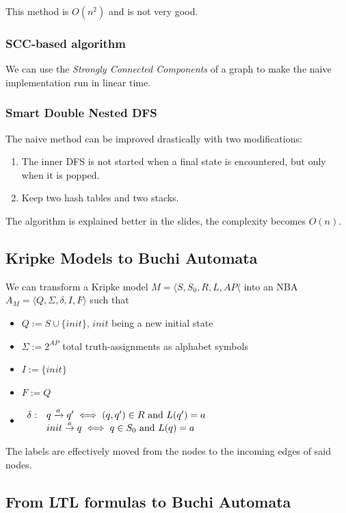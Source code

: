 \documentclass{article}
\begin{document}
This method is $O(n^2)$ and is not very good.

\subsubsection{SCC-based algorithm}
We can use the \textit{Strongly Connected Components} of a graph to make the naive implementation run in linear time.

\subsubsection{Smart Double Nested DFS}
The naive method can be improved drastically with two modifications:
\begin{enumerate}
    \item The inner DFS is not started when a final state is encountered, but only when it is popped.
    \item Keep two hash tables and two stacks.
\end{enumerate}

The algorithm is explained better in the slides, the complexity becomes $O(n)$.

\subsection{Kripke Models to Buchi Automata}
We can transform a Kripke model $M=\langle S, S_0, R, L, AP\langle$ into an NBA $A_M=\langle Q,\Sigma,\delta,I,F\rangle$ such that
\begin{itemize}
    \item $Q := S\cup \{init\}$, $init$ being a new initial state
    \item $\Sigma := 2^{AP}$ total truth-assignments as alphabet symbols
    \item $I := \{init\}$
    \item $F:=Q$
    \item $\begin{array}{rl}\delta: & q\xrightarrow{a} q' \iff (q,q')\in R \text{ and } L(q')=a\\
        & init\overset a \rightarrow q \iff q\in S_0 \text{ and } L(q)=a\end{array}$
\end{itemize}

The labels are effectively moved from the nodes to the incoming edges of said nodes.

\subsection{From LTL formulas to Buchi Automata}
\end{document}
